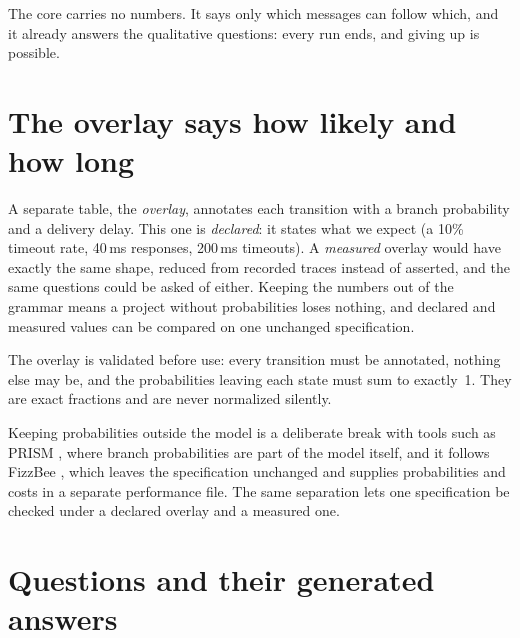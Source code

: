 The core carries no numbers. It says only which messages can follow which, and
it already answers the qualitative questions: every run ends, and giving up is
possible.

\section{The overlay says how likely and how long}

A separate table, the \emph{overlay}, annotates each transition with a branch
probability and a delivery delay. This one is \emph{declared}: it states what
we expect (a 10\% timeout rate, 40\,ms responses, 200\,ms timeouts). A
\emph{measured} overlay would have exactly the same shape, reduced from
recorded traces instead of asserted, and the same questions could be asked of
either. Keeping the numbers out of the grammar means a project without
probabilities loses nothing, and declared and measured values can be compared
on one unchanged specification.

The overlay is validated before use: every transition must be annotated,
nothing else may be, and the probabilities leaving each state must sum to
exactly~1. They are exact fractions and are never normalized silently.

\begin{herefigure}
\caption{The bounded-retry task (the core) with the declared overlay drawn on
its edges. Double borders mark terminal states.}
\label{fig:overlay-state-machine}
\end{herefigure}

Keeping probabilities outside the model is a deliberate break with tools such
as PRISM \citep{kwiatkowska2011prism}, where branch probabilities are part of
the model itself, and it follows FizzBee \citep{fizzbee}, which leaves the
specification unchanged and supplies probabilities and costs in a separate
performance file. The same separation lets one specification be checked under a
declared overlay and a measured one.

\section{Questions and their generated answers}

